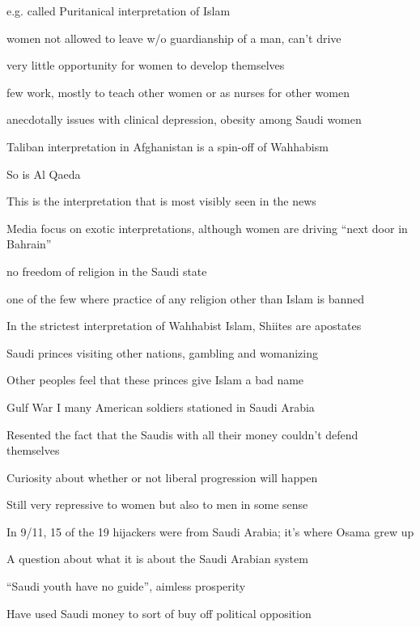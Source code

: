 \documentclass[12pt]{article}
\begin{document}
e.g. called Puritanical interpretation of Islam

women not allowed to leave w/o guardianship of a man, can't drive

very little opportunity for women to develop themselves

few work, mostly to teach other women or as nurses for other women

anecdotally issues with clinical depression, obesity among Saudi women

Taliban interpretation in Afghanistan is a spin-off of Wahhabism

So is Al Qaeda

This is the interpretation that is most visibly seen in the news

Media focus on exotic interpretations, although women are driving ``next door in Bahrain''

no freedom of religion in the Saudi state

one of the few where practice of any religion other than Islam is banned

In the strictest interpretation of Wahhabist Islam, Shiites are apostates

Saudi princes visiting other nations, gambling and womanizing

Other peoples feel that these princes give Islam a bad name

Gulf War I many American soldiers stationed in Saudi Arabia

Resented the fact that the Saudis with all their money couldn't defend themselves

Curiosity about whether or not liberal progression will happen

Still very repressive to women but also to men in some sense

In 9/11, 15 of the 19 hijackers were from Saudi Arabia; it's where Osama grew up

A question about what it is about the Saudi Arabian system

``Saudi youth have no guide'', aimless prosperity

Have used Saudi money to sort of buy off political opposition
\end{document}
